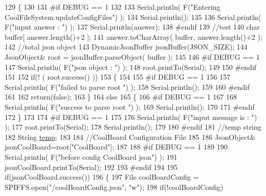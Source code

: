 \begin{DoxyCode}
129 \{
130 
131 \textcolor{preprocessor}{#if DEBUG == 1}
132 
133     Serial.println( F(\textcolor{stringliteral}{"Entering CoolFileSystem.updateConfigFiles"}) );
134     Serial.println();
135     
136     Serial.println( F(\textcolor{stringliteral}{"input answer : "}) );
137     Serial.println(answer);
138 \textcolor{preprocessor}{#endif}
139     \textcolor{comment}{//test}
140     \textcolor{keywordtype}{char} buffer[ answer.length()+2 ];
141     answer.toCharArray( buffer, answer.length()+2  );
142     \textcolor{comment}{//total json object }
143     DynamicJsonBuffer jsonBuffer(JSON\_SIZE);
144     JsonObject& root = jsonBuffer.parseObject( buffer );
145 
146 \textcolor{preprocessor}{#if DEBUG == 1}
147     Serial.println( F(\textcolor{stringliteral}{"json object : "}) );  
148     root.printTo(Serial);
149 
150 \textcolor{preprocessor}{#endif}
151 
152     \textcolor{keywordflow}{if}(! ( root.success() ))
153     \{
154     
155 \textcolor{preprocessor}{    #if DEBUG == 1}
156 
157         Serial.println( F(\textcolor{stringliteral}{"failed to parse root "}) );
158         Serial.println();
159     
160 \textcolor{preprocessor}{    #endif}
161 
162         \textcolor{keywordflow}{return}(\textcolor{keyword}{false});
163     \}
164     \textcolor{keywordflow}{else}
165     \{
166 \textcolor{preprocessor}{    #if DEBUG == 1}
167         
168         Serial.println( F(\textcolor{stringliteral}{"success to parse root "}) );
169         Serial.println();
170         
171 \textcolor{preprocessor}{    #endif  }
172     \}
173     
174 \textcolor{preprocessor}{#if DEBUG == 1}
175 
176     Serial.println( F(\textcolor{stringliteral}{"input message is : "}) );
177     root.printTo(Serial);
178     Serial.println();
179 
180 \textcolor{preprocessor}{#endif}
181     \textcolor{comment}{//temp string}
182     String \hyperlink{Irene3000_8h_a5905d48604152cf57aa6bfa087b49173}{temp};
183 
184     \textcolor{comment}{//CoolBoard Configuration File}
185 
186         JsonObject& jsonCoolBoard=root[\textcolor{stringliteral}{"CoolBoard"}];
187 
188 \textcolor{preprocessor}{#if DEBUG == 1}
189 
190     Serial.println( F(\textcolor{stringliteral}{"before config CoolBoard json"}) );
191     jsonCoolBoard.printTo(Serial);
192 
193 \textcolor{preprocessor}{#endif}
194 
195     \textcolor{keywordflow}{if}(jsonCoolBoard.success())
196     \{
197         File coolBoardConfig = SPIFFS.open(\textcolor{stringliteral}{"/coolBoardConfig.json"}, \textcolor{stringliteral}{"w"});   
198         \textcolor{keywordflow}{if}(!coolBoardConfig)

\end{DoxyCode}
